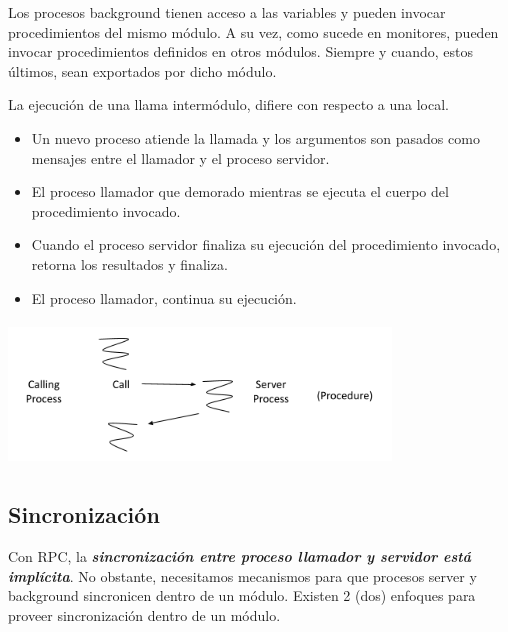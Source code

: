 \documentclass[a4paper, 10pt]{report}
\begin{document}
Los procesos background tienen acceso a las variables y pueden invocar procedimientos del mismo módulo. A su vez, como sucede en monitores, pueden invocar procedimientos definidos en otros módulos. Siempre y cuando, estos últimos, sean exportados por dicho módulo.

La ejecución de una llama intermódulo, difiere con respecto a una local.

\begin{itemize}
    \item Un nuevo proceso atiende la llamada y los argumentos son pasados como mensajes entre el llamador y el proceso servidor.
    \item El proceso llamador que demorado mientras se ejecuta el cuerpo del procedimiento invocado.
    \item Cuando el proceso servidor finaliza su ejecución del procedimiento invocado, retorna los resultados y finaliza.
    \item El proceso llamador, continua su ejecución.
\end{itemize}

\centerline{
    \includegraphics[width=4in, height=1.5in]{assets/rpc_execution.png}
}

\subsection{Sincronización}

Con RPC, la \textbf{\emph{sincronización entre proceso llamador y servidor está implícita}}. No obstante, necesitamos mecanismos para que procesos server y background sincronicen dentro de un módulo. Existen 2 (dos) enfoques para proveer sincronización dentro de un módulo.
\end{document}
